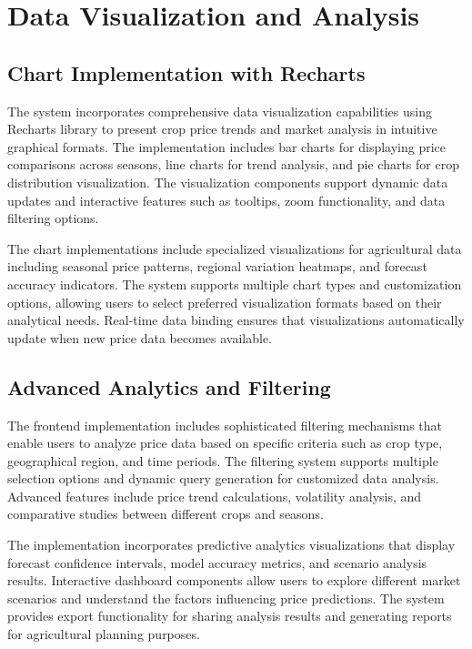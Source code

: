 \section{Data Visualization and Analysis}

\subsection{Chart Implementation with Recharts}

The system incorporates comprehensive data visualization capabilities using Recharts library to present crop price trends and market analysis in intuitive graphical formats. The implementation includes bar charts for displaying price comparisons across seasons, line charts for trend analysis, and pie charts for crop distribution visualization. The visualization components support dynamic data updates and interactive features such as tooltips, zoom functionality, and data filtering options.

The chart implementations include specialized visualizations for agricultural data including seasonal price patterns, regional variation heatmaps, and forecast accuracy indicators. The system supports multiple chart types and customization options, allowing users to select preferred visualization formats based on their analytical needs. Real-time data binding ensures that visualizations automatically update when new price data becomes available.

\subsection{Advanced Analytics and Filtering}

The frontend implementation includes sophisticated filtering mechanisms that enable users to analyze price data based on specific criteria such as crop type, geographical region, and time periods. The filtering system supports multiple selection options and dynamic query generation for customized data analysis. Advanced features include price trend calculations, volatility analysis, and comparative studies between different crops and seasons.

The implementation incorporates predictive analytics visualizations that display forecast confidence intervals, model accuracy metrics, and scenario analysis results. Interactive dashboard components allow users to explore different market scenarios and understand the factors influencing price predictions. The system provides export functionality for sharing analysis results and generating reports for agricultural planning purposes.


